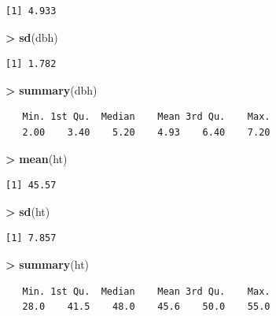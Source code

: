 \documentclass[]{krantz}
\makeatletter
\newenvironment{Shaded}{\begin{snugshade}}{\end{snugshade}}
\newcommand{\KeywordTok}[1]{\textcolor[rgb]{0.27,0.27,0.27}{\textbf{#1}}}
\newcommand{\NormalTok}[1]{#1}
\newcommand{\OperatorTok}[1]{\textcolor[rgb]{0.43,0.43,0.43}{\textbf{#1}}}
\newcommand{\StringTok}[1]{\textcolor[rgb]{0.5,0.5,0.5}{#1}}
\newenvironment{kframe}{%
\medskip{}
\setlength{\fboxsep}{.8em}
 \def\at@end@of@kframe{}%
 \ifinner\ifhmode%
  \def\at@end@of@kframe{\end{minipage}}%
  \begin{minipage}{\columnwidth}%
 \fi\fi%
 \def\FrameCommand##1{\hskip\@totalleftmargin \hskip-\fboxsep
 \colorbox{shadecolor}{##1}\hskip-\fboxsep
     \hskip-\linewidth \hskip-\@totalleftmargin \hskip\columnwidth}%
 \MakeFramed {\advance\hsize-\width
   \@totalleftmargin\z@ \linewidth\hsize
   \@setminipage}}%
 {\par\unskip\endMakeFramed%
 \at@end@of@kframe}
\renewenvironment{Shaded}{\begin{kframe}}{\end{kframe}}
\makeatother
\begin{document}
\begin{verbatim}
[1] 4.933
\end{verbatim}

\begin{Shaded}
\begin{Highlighting}[]
\OperatorTok{>}\StringTok{ }\KeywordTok{sd}\NormalTok{(dbh)}
\end{Highlighting}
\end{Shaded}

\begin{verbatim}
[1] 1.782
\end{verbatim}

\begin{Shaded}
\begin{Highlighting}[]
\OperatorTok{>}\StringTok{ }\KeywordTok{summary}\NormalTok{(dbh)}
\end{Highlighting}
\end{Shaded}

\begin{verbatim}
   Min. 1st Qu.  Median    Mean 3rd Qu.    Max. 
   2.00    3.40    5.20    4.93    6.40    7.20 
\end{verbatim}

\begin{Shaded}
\begin{Highlighting}[]
\OperatorTok{>}\StringTok{ }\KeywordTok{mean}\NormalTok{(ht)}
\end{Highlighting}
\end{Shaded}

\begin{verbatim}
[1] 45.57
\end{verbatim}

\begin{Shaded}
\begin{Highlighting}[]
\OperatorTok{>}\StringTok{ }\KeywordTok{sd}\NormalTok{(ht)}
\end{Highlighting}
\end{Shaded}

\begin{verbatim}
[1] 7.857
\end{verbatim}

\begin{Shaded}
\begin{Highlighting}[]
\OperatorTok{>}\StringTok{ }\KeywordTok{summary}\NormalTok{(ht)}
\end{Highlighting}
\end{Shaded}

\begin{verbatim}
   Min. 1st Qu.  Median    Mean 3rd Qu.    Max. 
   28.0    41.5    48.0    45.6    50.0    55.0 
\end{verbatim}
\end{document}
